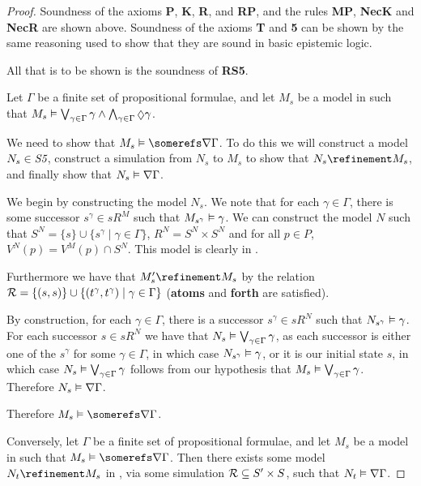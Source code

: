\begin{proof}
Soundness of the axioms {\bf P}, {\bf K}, {\bf R}, and {\bf RP}, and the rules
{\bf MP}, {\bf NecK} and {\bf NecR} are shown above. Soundness of the axioms
{\bf T} and {\bf 5} can be shown by the same reasoning used to show that they
are sound in basic epistemic logic.

All that is to be shown is the soundness of {\bf RS5}.

Let $\Gamma$ be a finite set of propositional formulae, and let $M_s$ be a model in
\classS{} such that $M_s \entails \bigvee_{\gamma \in \Gamma} \gamma \land
\bigwedge_{\gamma \in \Gamma} \suspects \gamma$.

We need to show that $M_s \entails \somerefs \covers \Gamma$. To do this we will
construct a model $N_s \in \textit{S5}$, construct a simulation from $N_s$ to $M_s$
to show that $N_s \refinement M_s$, and finally show that $N_s \vDash
\nabla \Gamma$.

We begin by constructing the model $N_s$. We note that for each $\gamma \in
\Gamma$, there is some successor $s^\gamma \in sR^{M}$ such that $M_{s^\gamma}
\vDash \gamma$.  We can construct the model $N$ such that $S^{N} = \{s\} \cup
\{s^\gamma \mid \gamma \in \Gamma\}$, $R^{N} = S^{N} \times S^{N}$ and for all
$p \in P$, $V^{N}(p) = V^M(p) \cap S^{N}$. This model is clearly in \classS.

Furthermore we have that $M'_s \refinement M_s$ by the relation ${\cal
R} = \{(s, s)\} \cup \{(t^\gamma, t^\gamma) \mid \gamma \in \Gamma\}$
({\bf atoms} and {\bf forth} are satisfied). 

By construction, for each $\gamma \in \Gamma$, there is a successor $s^\gamma
\in sR^{N}$ such that $N_{s^\gamma} \vDash \gamma$. For each successor $s
\in sR^{N}$ we have that $N_s \vDash \bigvee_{\gamma \in \Gamma}
\gamma$, as each successor is either one of the $s^\gamma$ for some $\gamma \in
\Gamma$, in which case $N_{s^\gamma} \vDash \gamma$, or it is our initial
state $s$, in which case $N_s \vDash \bigvee_{\gamma \in \Gamma} \gamma$
follows from our hypothesis that $M_s \vDash \bigvee_{\gamma \in \Gamma}
\gamma$. Therefore $N_s \vDash \nabla \Gamma$.

Therefore $M_s \entails \somerefs \covers \Gamma$. 

Conversely, let $\Gamma$ be a finite set of propositional formulae, and let
$M_s$ be a model in \classS{} such that $M_s \entails \somerefs \covers \Gamma$.
Then there exists some model $N_t \refinement M_s$ in \classS, via some
simulation ${\cal R} \subseteq S' \times S$, such that $N_t \vDash \nabla
\Gamma$.


\end{proof}
